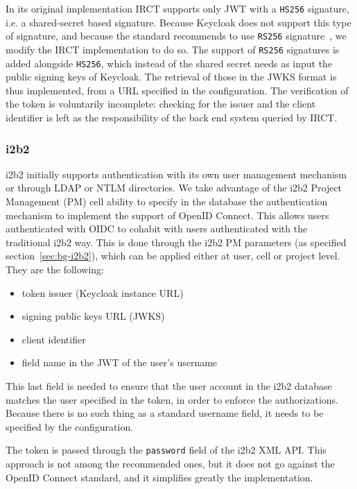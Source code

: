 In its original implementation IRCT supports only JWT with a \verb|HS256| signature, i.e. a shared-secret based signature. 
Because Keycloak does not support this type of signature, and because the standard recommends to use \verb|RS256| signature~\cite{rfc:oidc}, we modify the IRCT implementation to do so. 
The support of \verb|RS256| signatures is added alongside \verb|HS256|, which instead of the shared secret needs as input the public signing keys of Keycloak.
The retrieval of those in the JWKS format is thus implemented, from a URL specified in the configuration.
The verification of the token is voluntarily incomplete: checking for the issuer and the client identifier is left as the responsibility of the back end system queried by IRCT.

\subsubsection{i2b2}

i2b2 initially supports authentication with its own user management mechanism or through LDAP or NTLM directories.
We take advantage of the i2b2 Project Management (PM) cell ability to specify in the database the authentication mechanism to implement the support of OpenID Connect.
This allows users authenticated with OIDC to cohabit with users authenticated with the traditional i2b2 way.
This is done through the i2b2 PM parameters (as specified section~\ref{sec:bg-i2b2}), which can be applied either at user, cell or project level. 
They are the following:

\begin{itemize}
    \item token issuer (Keycloak instance URL)
    \item signing public keys URL (JWKS)
    \item client identifier
    \item field name in the JWT of the user's username
\end{itemize}

This last field is needed to ensure that the user account in the i2b2 database matches the user specified in the token, in order to enforce the authorizations.
Because there is no such thing as a standard username field, it needs to be specified by the configuration.

The token is passed through the \verb|password| field of the i2b2 XML API.
This approach is not among the recommended ones, but it does not go against the OpenID Connect standard, and it simplifies greatly the implementation.
